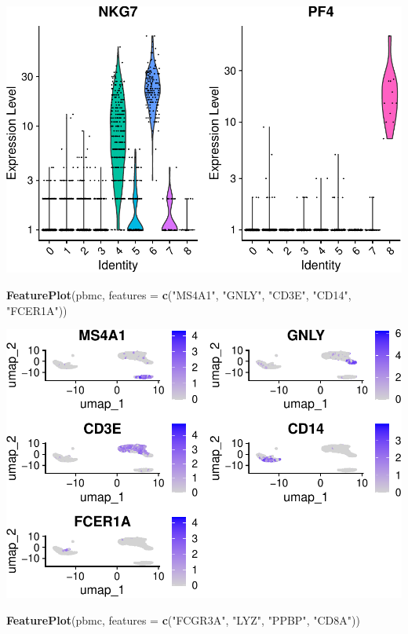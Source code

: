 \documentclass[
]{book}
\newenvironment{Shaded}{\begin{snugshade}}{\end{snugshade}}
\newcommand{\AttributeTok}[1]{\textcolor[rgb]{0.13,0.29,0.53}{#1}}
\newcommand{\FunctionTok}[1]{\textcolor[rgb]{0.13,0.29,0.53}{\textbf{#1}}}
\newcommand{\NormalTok}[1]{#1}
\newcommand{\StringTok}[1]{\textcolor[rgb]{0.31,0.60,0.02}{#1}}
\begin{document}
\includegraphics{scRNAseqInR_Doco_files/figure-latex/unnamed-chunk-29-2.pdf}

\begin{Shaded}
\begin{Highlighting}[]
\FunctionTok{FeaturePlot}\NormalTok{(pbmc, }\AttributeTok{features =} \FunctionTok{c}\NormalTok{(}\StringTok{"MS4A1"}\NormalTok{, }\StringTok{"GNLY"}\NormalTok{, }\StringTok{"CD3E"}\NormalTok{, }\StringTok{"CD14"}\NormalTok{, }\StringTok{"FCER1A"}\NormalTok{))}
\end{Highlighting}
\end{Shaded}

\includegraphics{scRNAseqInR_Doco_files/figure-latex/markerplots-1.pdf}

\begin{Shaded}
\begin{Highlighting}[]
\FunctionTok{FeaturePlot}\NormalTok{(pbmc, }\AttributeTok{features =} \FunctionTok{c}\NormalTok{(}\StringTok{"FCGR3A"}\NormalTok{, }\StringTok{"LYZ"}\NormalTok{, }\StringTok{"PPBP"}\NormalTok{, }\StringTok{"CD8A"}\NormalTok{))}
\end{Highlighting}
\end{Shaded}
\end{document}
